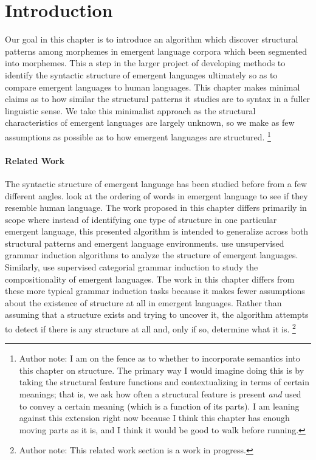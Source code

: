 \newcommand\tsc\textsc

\section{Introduction}

Our goal in this chapter is to introduce an algorithm which discover structural patterns among morphemes in emergent language corpora which been segmented into morphemes.
This a step in the larger project of developing methods to identify the syntactic structure of emergent languages ultimately so as to compare emergent languages to human languages.
This chapter makes minimal claims as to how similar the structural patterns it studies are to syntax in a fuller linguistic sense.
We take this minimalist approach as the structural characteristics of emergent languages are largely unknown, so we make as few assumptions as possible as to how emergent languages are structured.
\unskip\footnote{Author note: I am on the fence as to whether to incorporate semantics into this chapter on structure. The primary way I would imagine doing this is by taking the structural feature functions and contextualizing in terms of certain meanings; that is, we ask how often a structural feature is present \emph{and} used to convey a certain meaning (which is a function of its parts).  I am leaning against this extension right now because I think this chapter has enough moving parts as it is, and I think it would be good to walk before running.}

\paragraph{Related Work}
The syntactic structure of emergent language has been studied before from a few different angles.
 look at the ordering of words in emergent language to see if they resemble human language.
The work proposed in this chapter differs primarily in scope where instead of identifying one type of structure in one particular emergent language, this presented algorithm is intended to generalize across both structural patterns and emergent language environments.
 use unsupervised grammar induction algorithms to analyze the structure of emergent languages.
Similarly, \citet{ueda2022categorial} use supervised categorial grammar induction to study the compositionality of emergent languages.
The work in this chapter differs from these more typical grammar induction tasks because it makes fewer assumptions about the existence of structure at all in emergent languages.
Rather than assuming that a structure exists and trying to uncover it, the algorithm attempts to detect if there is any structure at all and, only if so, determine what it is.
\unskip\footnote{Author note: This related work section is a work in progress.}

